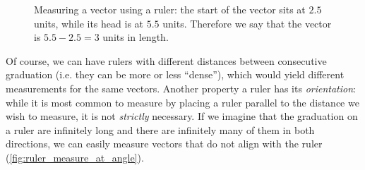 \begin{figure}
    \begin{center}
    \end{center}
    \caption{Measuring a vector using a ruler: the start of the vector sits at $2.5$ units, while its head is at $5.5$ units. Therefore we say that the vector is $5.5-2.5=3$ units in length.}
    \label{fig:ruler_measure}
\end{figure}

Of course, we can have rulers with different distances between consecutive graduation (i.e. they can be more or less \enquote{dense}), which would yield different measurements for the same vectors. Another property a ruler has its \textit{orientation}: while it is most common to measure by placing a ruler parallel to the distance we wish to measure, it is not \textit{strictly} necessary. If we imagine that the graduation on a ruler are infinitely long and there are infinitely many of them in both directions, we can easily measure vectors that do not align with the ruler (\cref{fig:ruler_measure_at_angle}).

